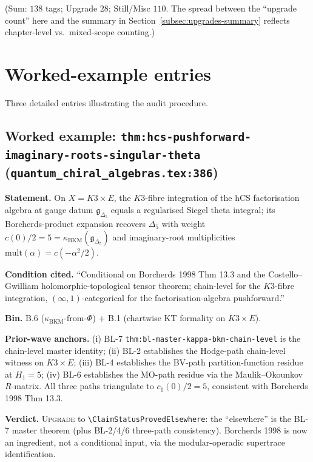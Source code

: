 \documentclass[11pt]{amsart}
\providecommand{\kBKM}{\kappa_{\mathrm{BKM}}}
\providecommand{\fg}{\mathfrak{g}}
\begin{document}
{{(Sum: $138$ tags; Upgrade $28$; Still/Misc $110$. The spread between
the ``upgrade count'' here and the summary in
Section~\ref{subsec:upgrades-summary} reflects chapter-level vs.\
mixed-scope counting.)

\section{Worked-example entries}
\label{sec:worked-examples}

Three detailed entries illustrating the audit procedure.

\subsection{Worked example: \texttt{thm:hcs-pushforward-imaginary-roots-singular-theta} (\texttt{quantum\_chiral\_algebras.tex:386})}

\textbf{Statement.} On $X = K3 \times E$, the $K3$-fibre integration
of the hCS factorisation algebra at gauge datum $\fg_{\Delta_5}$ equals
a regularised Siegel theta integral; its Borcherds-product expansion
recovers $\Delta_5$ with weight $c(0)/2 = 5 = \kBKM(\fg_{\Delta_5})$
and imaginary-root multiplicities $\mathrm{mult}(\alpha) = c(-\alpha^2/2)$.

\textbf{Condition cited.} ``Conditional on Borcherds 1998 Thm 13.3
and the Costello--Gwilliam holomorphic-topological tensor theorem;
chain-level for the $K3$-fibre integration, $(\infty,1)$-categorical
for the factorisation-algebra pushforward.''

\textbf{Bin.} B.6 ($\kBKM$-from-$\Phi$) + B.1 (chartwise KT formality
on $K3 \times E$).

\textbf{Prior-wave anchors.} (i) BL-7 \texttt{thm:bl-master-kappa-bkm-chain-level}
is the chain-level master identity; (ii) BL-2 establishes the
Hodge-path chain-level witness on $K3 \times E$; (iii) BL-4 establishes
the BV-path partition-function residue at $H_1 = 5$; (iv) BL-6
establishes the MO-path residue via the Maulik--Okounkov $R$-matrix.
All three paths triangulate to $c_1(0)/2 = 5$, consistent with
Borcherds 1998 Thm 13.3.

\textbf{Verdict.} \textsc{Upgrade} to
\texttt{\textbackslash ClaimStatusProvedElsewhere}: the ``elsewhere''
is the BL-7 master theorem (plus BL-2/4/6 three-path consistency).
Borcherds 1998 is now an ingredient, not a conditional input, via the
modular-operadic supertrace identification.

}}
\end{document}
